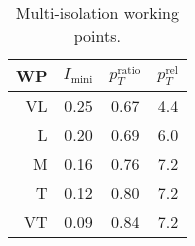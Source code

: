 \begin{table}
 \begin{center}
   \small
   \begin{tabular}{r|ccc}
     WP & $I_\text{mini}$ & $p_T^\text{ratio}$ & $p_T^\text{rel}$  \\
     \hline
     VL & 0.25 & 0.67 & 4.4 \\
     L  & 0.20 & 0.69 & 6.0 \\
     M  & 0.16 & 0.76 & 7.2 \\
     T  & 0.12 & 0.80 & 7.2 \\
     VT & 0.09 & 0.84 & 7.2 \\
   \end{tabular}
   \caption{Multi-isolation working points.}
   \label{table:multiIsoWP}
 \end{center}
\end{table}
